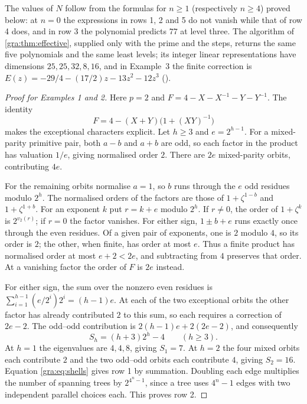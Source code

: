 The values of $N$ follow from the formulas for $n\ge1$ (respectively
$n\ge4$) proved below: at $n=0$ the expressions in rows 1, 2 and 5 do not
vanish while that of row 4 does, and in row 3 the polynomial predicts $77$
at level three. The algorithm of \cref{gra:thm:effective}, supplied only
with the prime and the steps, returns the same five polynomials and the
same least levels; its integer linear representations have dimensions
$25,25,32,8,16$, and in Example~3 the finite correction is
$E(z)=-29/4-(17/2)z-13z^2-12z^3$
().

\begin{proof}[Proof for Examples 1 and 2]
Here $p=2$ and $F=4-X-X^{-1}-Y-Y^{-1}$. The identity
\[
 F=4-(X+Y)\bigl(1+(XY)^{-1}\bigr)
\]
makes the exceptional characters explicit. Let $h\ge3$ and $e=2^{h-1}$.
For a mixed-parity primitive pair, both $a-b$ and $a+b$ are odd, so each
factor in the product has valuation $1/e$, giving normalised order $2$.
There are $2e$ mixed-parity orbits, contributing $4e$.

For the remaining orbits normalise $a=1$, so $b$ runs through the $e$ odd
residues modulo $2^h$. The normalised orders of the factors are those of
$1+\zeta^{1-b}$ and $1+\zeta^{1+b}$. For an exponent $k$ put $r=k+e$ modulo
$2^h$. If $r\ne0$, the order of $1+\zeta^k$ is $2^{v_2(r)}$; if $r=0$ the
factor vanishes. For either sign, $1\pm b+e$ runs exactly once through the
even residues. Of a given pair of exponents, one is $2$ modulo $4$, so its
order is $2$; the other, when finite, has order at most $e$. Thus a finite
product has normalised order at most $e+2<2e$, and subtracting from $4$
preserves that order. At a vanishing factor the order of $F$ is $2e$
instead.

For either sign, the sum over the nonzero even residues is
$\sum_{i=1}^{h-1}(e/2^i)2^i=(h-1)e$. At each of the two exceptional orbits
the other factor has already contributed $2$ to this sum, so each requires
a correction of $2e-2$. The odd--odd contribution is $2(h-1)e+2(2e-2)$, and
consequently
\[
 S_h=(h+3)2^h-4\qquad(h\ge3).
\]
At $h=1$ the eigenvalues are $4,4,8$, giving $S_1=7$. At $h=2$ the four
mixed orbits each contribute $2$ and the two odd--odd orbits each
contribute $4$, giving $S_2=16$. Equation \eqref{gra:eq:shells} gives row 1
by summation. Doubling each edge multiplies the number of spanning trees by
$2^{4^n-1}$, since a tree uses $4^n-1$ edges with two independent parallel
choices each. This proves row 2.
\end{proof}

